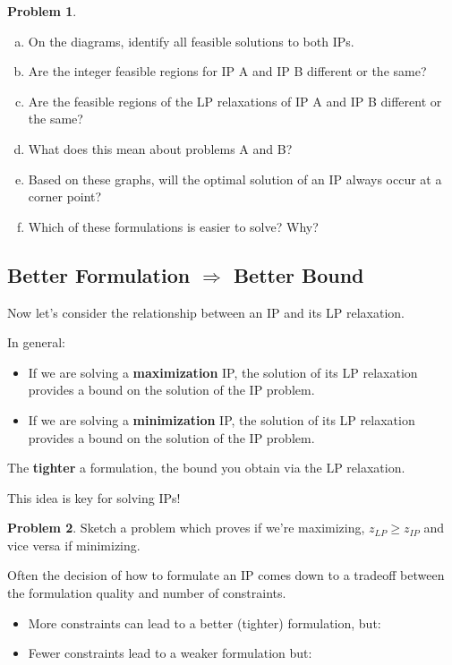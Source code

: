 \documentclass[11pt]{article}
\theoremstyle{definition}
\newtheorem{problem}{Problem}
\newcommand{\answerbox}[3]{%
  \fbox{%
    \begin{minipage}[#1]{#2}
      \hfill\vspace{#3}
    \end{minipage}
  }
}
\newcommand{\wordbox}{\answerbox{c}{1.2in}{.7cm}}
\begin{document}
\begin{problem}
\begin{enumerate}[(a)]
   \item On the diagrams, identify all feasible solutions to both IPs.
   \item Are the integer feasible regions for IP A and IP B different or the same? \vspace{0.5in}
   \item Are the feasible regions of the LP relaxations of IP A and IP B different or the same? \vspace{0.5in}
   \item What does this mean about problems A and B? \vspace{0.5in}
   \item Based on these graphs, will the optimal solution of an IP always occur at a corner point? \vspace{0.5in}
   \item Which of these formulations is easier to solve? Why? \vspace{1in}

\end{enumerate}
\end{problem}

\subsection{Better Formulation $\Rightarrow$ Better Bound}

Now let's consider the relationship between an IP and its LP relaxation.

\bigskip

In general:
	\begin{itemize}
	\item If we are solving a \textbf{maximization} IP, the solution of its LP relaxation provides a \wordbox bound on the solution of the IP problem.
	\item If we are solving a \textbf{minimization} IP, the solution of its LP relaxation provides a \wordbox bound on the solution of the IP problem.
	\end{itemize}

The \textbf{tighter} a formulation, the \wordbox bound you obtain via the LP relaxation.

\begin{tcolorbox}
This idea is key for solving IPs!
\end{tcolorbox}	
\begin{problem}
Sketch a problem which proves if we're maximizing, $z_{LP} \geq z_{IP}$ and vice versa if minimizing.
\end{problem}

Often the decision of how to formulate an IP comes down to a tradeoff between the formulation quality and number of constraints.
\begin{itemize}
\item More constraints can lead to a better (tighter) formulation, but: \vspace{0.5in}
\item Fewer constraints lead to a weaker formulation but:
\end{itemize}	
\end{document}
